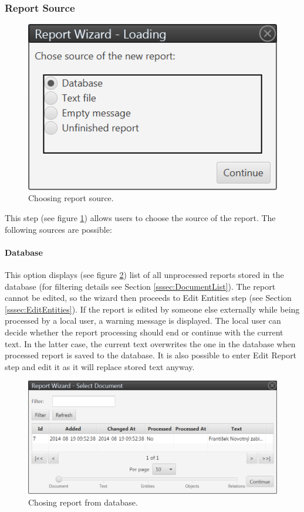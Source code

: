 \subsubsection{Report Source}
\label{sssec:ReportSource}

\begin{figure}[!htb]
        \centering
        \includegraphics{Images/source}
        \caption{Choosing report source.}
        \label{fig:Source}
\end{figure}

This step (see figure \ref{fig:Source}) allows users to choose the source of the
report. The following sources are possible:

\paragraph{Database} This option displays (see figure \ref{fig:Database}) list
of all unprocessed reports stored in the database (for filtering details see
Section \ref{sssec:DocumentList}).
The report cannot be edited, so the wizard then proceeds to Edit Entities step
(see Section \ref{sssec:EditEntities}).  If the report is edited by someone else
externally while being processed by a local user, a warning message is
displayed. The local user can decide whether the report processing should end or
continue with the current text. In the latter case, the current text overwrites
the one in the database when processed report is saved to the database. It is
also possible to enter Edit Report step and edit it as it will replace stored
text anyway.

\begin{figure}[!htb]
        \centering
        \includegraphics[width=\textwidth]{Images/database}
        \caption{Chosing report from database.}
        \label{fig:Database}
\end{figure}

